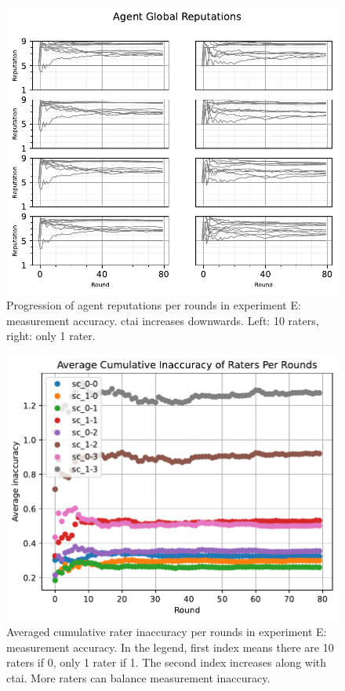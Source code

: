 \documentclass[%
    ]{\PathToTumTemplate/thesis/tum_thesis}
\begin{document}
\begin{figure}[tbp]
  \begin{center}
        \includegraphics[width=0.75\linewidth]	{../results/e/ReputationsPerRounds_joined.pdf}
    \caption{
 	Progression of agent reputations per rounds in experiment E: measurement accuracy.
    \Gls{ctai} increases downwards.
    Left: 10 raters, right: only 1 rater.
    }
    \label{fig:res_e_reps}
  \end{center}
\end{figure}

\begin{figure}[tbp]
  \begin{center}
        \includegraphics[width=0.75\linewidth]	{../results/e/AvgAccuracyPerRound.pdf}
    \caption{
    Averaged cumulative rater inaccuracy per rounds in experiment E: measurement accuracy.
    In the legend, first index means there are 10 raters if 0, only 1 rater if 1.
    The second index increases along with \gls{ctai}.
    More raters can balance measurement inaccuracy.
    }
    \label{fig:res_e_rateinaccuracy}
  \end{center}
\end{figure}
\end{document}
